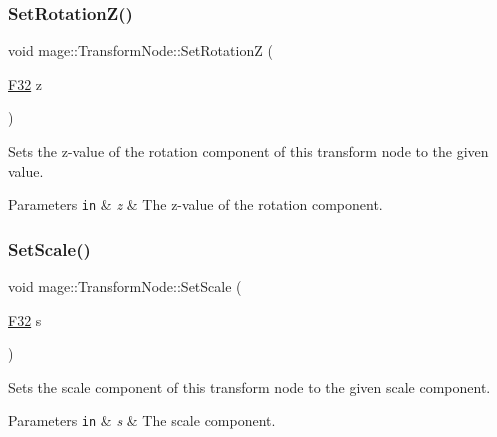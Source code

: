 \subsubsection{\texorpdfstring{Set\+Rotation\+Z()}{SetRotationZ()}}
{\footnotesize\ttfamily void mage\+::\+Transform\+Node\+::\+Set\+RotationZ (\begin{DoxyParamCaption}\item[{\hyperlink{namespacemage_aa97e833b45f06d60a0a9c4fc22ae02c0}{F32}}]{z }\end{DoxyParamCaption})\hspace{0.3cm}{\ttfamily [noexcept]}}

Sets the z-\/value of the rotation component of this transform node to the given value.


\begin{DoxyParams}[1]{Parameters}
\mbox{\tt in}  & {\em z} & The z-\/value of the rotation component. \\
\hline
\end{DoxyParams}
\hypertarget{structmage_1_1_transform_node_ab0d7ee104cc1815ce89b09fac56e9a1d}{}\label{structmage_1_1_transform_node_ab0d7ee104cc1815ce89b09fac56e9a1d} 
\subsubsection{\texorpdfstring{Set\+Scale()}{SetScale()}\hspace{0.1cm}{\footnotesize\ttfamily [1/5]}}
{\footnotesize\ttfamily void mage\+::\+Transform\+Node\+::\+Set\+Scale (\begin{DoxyParamCaption}\item[{\hyperlink{namespacemage_aa97e833b45f06d60a0a9c4fc22ae02c0}{F32}}]{s }\end{DoxyParamCaption})\hspace{0.3cm}{\ttfamily [noexcept]}}

Sets the scale component of this transform node to the given scale component.


\begin{DoxyParams}[1]{Parameters}
\mbox{\tt in}  & {\em s} & The scale component. \\
\hline
\end{DoxyParams}
\hypertarget{structmage_1_1_transform_node_a66336ad1e8afafafca4f4b78f874bad9}{}\label{structmage_1_1_transform_node_a66336ad1e8afafafca4f4b78f874bad9} 
